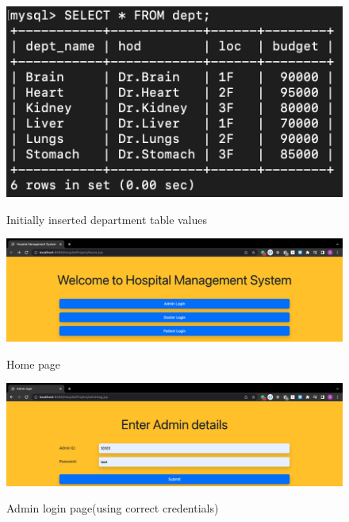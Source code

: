 \documentclass[12pt]{article}
\begin{document}
\begin{figure}[!hbt]
    \centering
    \includegraphics[scale=1.0]{screenshots/1d.png}
    \label{fig:my_label1}
    \caption{Initially inserted department table values}
\end{figure}

\newpage

\begin{figure}[!hbt]
    \centering
    \includegraphics[scale=0.35]{screenshots/2a.png}
    \label{fig:data}
    \caption{Home page}
\end{figure}

\vspace{15mm}

\begin{figure}[!hbt]
    \centering
    \includegraphics[scale=0.35]{screenshots/2b.png}
    \label{fig:my_label1}
    \caption{Admin login page(using correct credentials)}
\end{figure}
\end{document}
